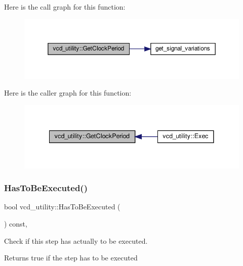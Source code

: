 Here is the call graph for this function\+:
\nopagebreak
\begin{figure}[H]
\begin{center}
\leavevmode
\includegraphics[width=350pt]{d8/d51/classvcd__utility_a8860891d7d9c6188515feb8ab0bddcf0_cgraph}
\end{center}
\end{figure}
Here is the caller graph for this function\+:
\nopagebreak
\begin{figure}[H]
\begin{center}
\leavevmode
\includegraphics[width=341pt]{d8/d51/classvcd__utility_a8860891d7d9c6188515feb8ab0bddcf0_icgraph}
\end{center}
\end{figure}
\mbox{\label{classvcd__utility_a09e32be65c7938434bf02c9f08a49f0d}} 
\subsubsection{\texorpdfstring{Has\+To\+Be\+Executed()}{HasToBeExecuted()}}
{\footnotesize\ttfamily bool vcd\+\_\+utility\+::\+Has\+To\+Be\+Executed (\begin{DoxyParamCaption}{ }\end{DoxyParamCaption}) const\hspace{0.3cm}{\ttfamily [override]}, {\ttfamily [virtual]}}



Check if this step has actually to be executed. 

\begin{DoxyReturn}{Returns}
true if the step has to be executed 
\end{DoxyReturn}


